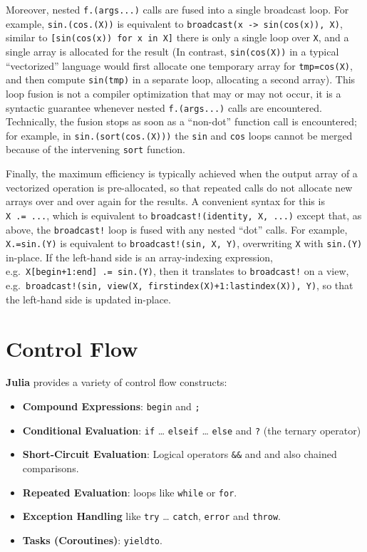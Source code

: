 \documentclass[
]{article}
\providecommand{\tightlist}{%
  \setlength{\itemsep}{0pt}\setlength{\parskip}{0pt}}
\begin{document}
Moreover, nested \texttt{f.(args...)} calls are fused into a single
broadcast loop. For example, \texttt{sin.(cos.(X))} is equivalent to
\texttt{broadcast(x\ -\textgreater{}\ sin(cos(x)),\ X)}, similar to
\texttt{{[}sin(cos(x))\ for\ x\ in\ X{]}} there is only a single loop
over \texttt{X}, and a single array is allocated for the result (In
contrast, \texttt{sin(cos(X))} in a typical ``vectorized'' language
would first allocate one temporary array for \texttt{tmp=cos(X)}, and
then compute \texttt{sin(tmp)} in a separate loop, allocating a second
array). This loop fusion is not a compiler optimization that may or may
not occur, it is a syntactic guarantee whenever nested
\texttt{f.(args...)} calls are encountered. Technically, the fusion
stops as soon as a ``non-dot'' function call is encountered; for
example, in \texttt{sin.(sort(cos.(X)))} the \texttt{sin} and
\texttt{cos} loops cannot be merged because of the intervening
\texttt{sort} function.

Finally, the maximum efficiency is typically achieved when the output
array of a vectorized operation is pre-allocated, so that repeated calls
do not allocate new arrays over and over again for the results. A
convenient syntax for this is \texttt{X\ .=\ ...}, which is equivalent
to \texttt{broadcast!(identity,\ X,\ ...)} except that, as above, the
\texttt{broadcast!} loop is fused with any nested ``dot'' calls. For
example, \texttt{X.=sin.(Y)} is equivalent to
\texttt{broadcast!(sin,\ X,\ Y)}, overwriting \texttt{X} with
\texttt{sin.(Y)} in-place. If the left-hand side is an array-indexing
expression, e.g.~\texttt{X{[}begin+1:end{]}\ .=\ sin.(Y)}, then it
translates to \texttt{broadcast!} on a view,
e.g.~\texttt{broadcast!(sin,\ view(X,\ firstindex(X)+1:lastindex(X)),\ Y)},
so that the left-hand side is updated in-place.

\newpage

\hypertarget{control-flow}{%
\section{Control Flow}\label{control-flow}}

\textbf{Julia} provides a variety of control flow constructs:

\begin{itemize}
\tightlist
\item
  \textbf{Compound Expressions}: \texttt{begin} and \texttt{;}
\item
  \textbf{Conditional Evaluation}: \texttt{if} \ldots{} \texttt{elseif}
  \ldots{} \texttt{else} and \texttt{?} (the ternary operator)
\item
  \textbf{Short-Circuit Evaluation}: Logical operators \texttt{\&\&} and
  \texttt{\textbar{}\textbar{}} and also chained comparisons.
\item
  \textbf{Repeated Evaluation}: loops like \texttt{while} or
  \texttt{for}.
\item
  \textbf{Exception Handling} like \texttt{try} \ldots{} \texttt{catch},
  \texttt{error} and \texttt{throw}.
\item
  \textbf{Tasks (Coroutines)}: \texttt{yieldto}.
\end{itemize}
\end{document}

